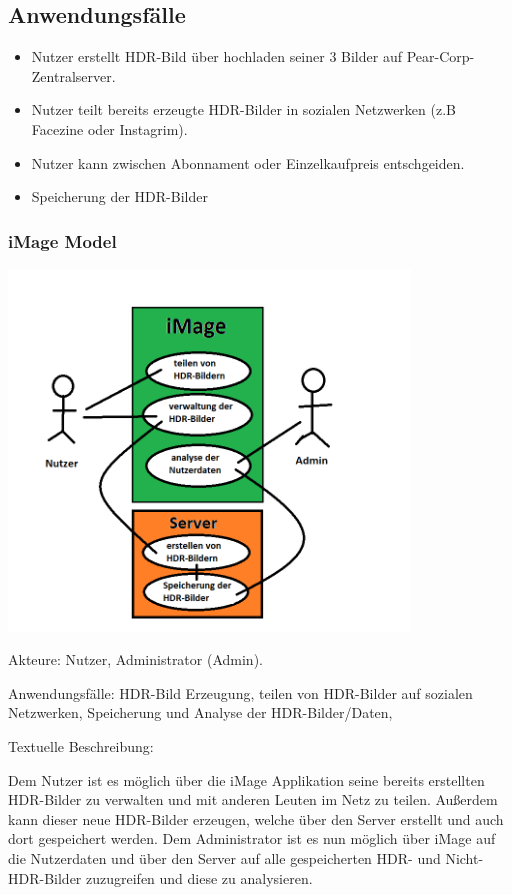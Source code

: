 \documentclass[parskip=full]{scrartcl}
\begin{document}
\subsection{Anwendungsfälle}
\begin{itemize}[nosep]
\item Nutzer erstellt HDR-Bild über hochladen seiner 3 Bilder auf Pear-Corp-Zentralserver.
\item Nutzer teilt bereits erzeugte HDR-Bilder in sozialen Netzwerken (z.B Facezine oder Instagrim).
\item Nutzer kann zwischen Abonnament oder Einzelkaufpreis entschgeiden.
\item Speicherung der HDR-Bilder
\end{itemize}
\subsubsection{iMage Model}
\begin{center}
\includegraphics[width=0.8\textwidth]{iMageModel.png}
\end{center}

Akteure: Nutzer, Administrator (Admin).

Anwendungsfälle: HDR-Bild Erzeugung, teilen von HDR-Bilder auf sozialen Netzwerken, Speicherung und Analyse der HDR-Bilder/Daten, 

Textuelle Beschreibung: 

Dem Nutzer ist es möglich über die iMage Applikation seine bereits erstellten HDR-Bilder zu verwalten und mit anderen Leuten im Netz zu teilen. Außerdem kann dieser neue HDR-Bilder erzeugen, welche über den Server erstellt und auch dort gespeichert werden. Dem Administrator ist es nun möglich über iMage auf die Nutzerdaten und über den Server auf alle gespeicherten HDR- und Nicht-HDR-Bilder zuzugreifen und diese zu analysieren.

%
%
\printnoidxglossaries
\end{document}
